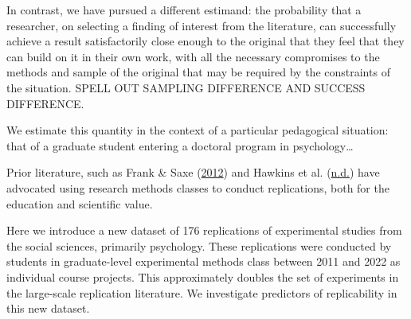 \documentclass[
  english,
  a4paper,
]{article}
\begin{document}
In contrast, we have pursued a different estimand: the probability that a researcher, on selecting a finding of interest from the literature, can successfully achieve a result satisfactorily close enough to the original that they feel that they can build on it in their own work, with all the necessary compromises to the methods and sample of the original that may be required by the constraints of the situation. SPELL OUT SAMPLING DIFFERENCE AND SUCCESS DIFFERENCE.

We estimate this quantity in the context of a particular pedagogical situation: that of a graduate student entering a doctoral program in psychology\ldots{}

Prior literature, such as Frank \& Saxe (\protect\hyperlink{ref-frank2012}{2012}) and Hawkins et al. (\protect\hyperlink{ref-hawkins}{n.d.}) have advocated using research methods classes to conduct replications, both for the education and scientific value.

Here we introduce a new dataset of 176 replications of experimental studies from the social sciences, primarily psychology. These replications were conducted by students in graduate-level experimental methods class between 2011 and 2022 as individual course projects. This approximately doubles the set of experiments in the large-scale replication literature. We investigate predictors of replicability in this new dataset.

    
\end{document}
